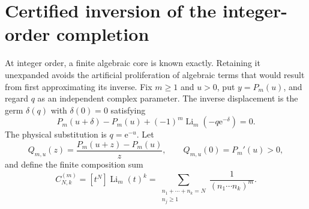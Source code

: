 \documentclass[11pt,a4paper]{article}
\theoremstyle{definition}\newtheorem{definition}[theorem]{Definition}
\theoremstyle{remark}\newtheorem{remark}[theorem]{Remark}
\newcommand{\Li}{\operatorname{Li}}
\newcommand{\ee}{\mathrm e}
\newcommand{\coeff}[2]{[#1^{#2}]}
\numberwithin{equation}{section}
\begin{document}
\section{Certified inversion of the integer-order completion}\label{sec:general-inverse}

At integer order, a finite algebraic core is known exactly. Retaining it
unexpanded avoids the artificial proliferation of algebraic terms that
would result from first approximating its inverse.
Fix $m\ge1$ and $u>0$, put $y=P_m(u)$, and regard $q$ as an independent
complex parameter. The inverse displacement is the germ $\delta(q)$ with
$\delta(0)=0$ satisfying
\begin{equation}\label{eq:general-inverse-equation}
 P_m(u+\delta)-P_m(u)+(-1)^m\Li_m(-q\ee^{-\delta})=0.
\end{equation}
The physical substitution is $q=\ee^{-u}$.
Let
\begin{equation}\label{eq:Qcore}
 Q_{m,u}(z)=\frac{P_m(u+z)-P_m(u)}z,
 \qquad Q_{m,u}(0)=P_m'(u)>0,
\end{equation}
and define the finite composition sum
\begin{equation}\label{eq:composition}
 C^{(m)}_{N,k}=\coeff{t}{N}\Li_m(t)^k
   =\sum_{\substack{n_1+\cdots+n_k=N\\n_j\ge1}}
                     \frac1{(n_1\cdots n_k)^m}.
\end{equation}
\end{document}
